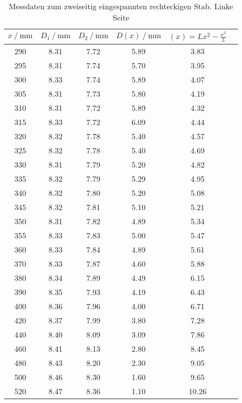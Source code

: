 \begin{table}
  \centering
  \caption{Messdaten zum zweiseitig eingespannten rechteckigen Stab. Linke Seite}
  \label{tab:zweiwerte}
  \begin{tabular}{c c c c c c}
    \toprule
      $x\:/\:\si{\milli\meter}$ & $D_1\:/\:\si{\milli\meter}$ & $D_2\:/\:\si{\milli\meter}$ & $D(x)\:/\:\si{\milli\meter}$ & $(x)=Lx^2-\frac{x^3}{3}$ \\
    \midrule
      290 & 8.31 & 7.72  & 5.89 & 3.83 \\
      295 & 8.31 & 7.74  & 5.70 & 3.95 \\
      300 & 8.33 & 7.74  & 5.89 & 4.07 \\
      305 & 8.31 & 7.73  & 5.80 & 4.19 \\
      310 & 8.31 & 7.72  & 5.89 & 4.32 \\
      315 & 8.33 & 7.72  & 6.09 & 4.44 \\
      320 & 8.32 & 7.78  & 5.40 & 4.57 \\
      325 & 8.32 & 7.78  & 5.40 & 4.69 \\
      330 & 8.31 & 7.79  & 5.20 & 4.82 \\
      335 & 8.32 & 7.79  & 5.29 & 4.95 \\
      340 & 8.32 & 7.80  & 5.20 & 5.08 \\
      345 & 8.32 & 7.81  & 5.10 & 5.21 \\
      350 & 8.31 & 7.82  & 4.89 & 5.34 \\
      355 & 8.33 & 7.83  & 5.00 & 5.47 \\
      360 & 8.33 & 7.84  & 4.89 & 5.61 \\
      370 & 8.33 & 7.87  & 4.60 & 5.88 \\
      380 & 8.34 & 7.89  & 4.49 & 6.15 \\
      390 & 8.35 & 7.93  & 4.19 & 6.43 \\
      400 & 8.36 & 7.96  & 4.00 & 6.71 \\
      420 & 8.37 & 7.99  & 3.80 & 7.28 \\
      440 & 8.40 & 8.09  & 3.09 & 7.86 \\
      460 & 8.41 & 8.13  & 2.80 & 8.45 \\
      480 & 8.43 & 8.20  & 2.30 & 9.05 \\
      500 & 8.46 & 8.30  & 1.60 & 9.65 \\
      520 & 8.47 & 8.36  & 1.10 & 10.26 \\
    \bottomrule
  \end{tabular}
\end{table}

